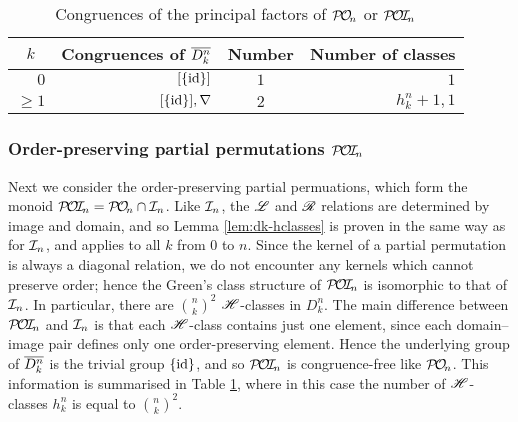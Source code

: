 \begin{table}[ht]
  \centering
  \renewcommand{\arraystretch}{1.3}
  \begin{tabular}{| r | r | c | r |}
    \hline
    \multicolumn{1}{|c|}{$k$}
    & \multicolumn{1}{c|}{\textbf{Congruences of $\overline{D_k^n}$}}
    & \textbf{Number}
    & \multicolumn{1}{c|}{\textbf{Number of classes}} \\
    \hline
    $0$ & $[\{\operatorname{id}\}]$ & $1$ & $1$ \\
    $\geq 1$
    & $[\{\operatorname{id}\}], \nabla$
    & $2$
    & $h_k^n + 1, 1$ \\
    \hline
  \end{tabular}
  \caption{Congruences of the principal factors of $\mathcal{P\!O\!}_n$ or
    $\mathcal{P\!O\!I\!}_n$}
  \label{tab:dkstar-congs-pon}
\end{table}

\subsubsection{Order-preserving partial permutations $\mathcal{P\!O\!I\!}_n$}
\label{sec:princfact-poin}
Next we consider the order-preserving partial permuations, which form the monoid
$\mathcal{P\!O\!I\!}_n = \mathcal{P\!O\!}_n \cap \mathcal{I}_n$.  Like $\mathcal{I}_n$, the $\mathrel{\mathscr{L}}$ and $\mathrel{\mathscr{R}}$ relations are
determined by image and domain, and so Lemma \ref{lem:dk-hclasses} is proven in
the same way as for $\mathcal{I}_n$, and applies to all $k$ from $0$ to $n$.  Since the
kernel of a partial permutation is always a diagonal relation, we do not
encounter any kernels which cannot preserve order; hence the Green's class structure of
$\mathcal{P\!O\!I\!}_n$ is isomorphic to that of $\mathcal{I}_n$.  In particular, there are
$\binom{n}{k}^2$ $\mathrel{\mathscr{H}}$-classes in $D_k^n$.  The main difference between $\mathcal{P\!O\!I\!}_n$
and $\mathcal{I}_n$ is that each $\mathrel{\mathscr{H}}$-class contains just one element, since each
domain--image pair defines only one order-preserving element.  Hence the
underlying group of $\overline{D_k^n}$ is the trivial group $\{\operatorname{id}\}$, and so $\mathcal{P\!O\!I\!}_n$ is
congruence-free like $\mathcal{P\!O\!}_n$.  This information is summarised in Table
\ref{tab:dkstar-congs-pon}, where in this case the number of $\mathrel{\mathscr{H}}$-classes
$h_k^n$ is equal to $\binom{n}{k}^2$.

